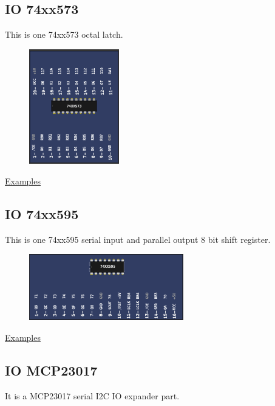 \subsection{IO 74xx573}

This is one 74xx573 octal latch.

\begin{figure}[H]
\center
\includegraphics[width=0.35\textwidth]{img/part_74xx573.png} 
\end{figure} 

\href{https://lcgamboa.github.io/picsimlab_examples/parts_IO_74xx573.html}{Examples} 

\subsection{IO 74xx595}

This is one 74xx595 serial input and parallel output 8 bit shift register.

\begin{figure}[H]
\center
\includegraphics[width=0.6\textwidth]{img/part_74xx595.png} 
\end{figure} 

\href{https://lcgamboa.github.io/picsimlab_examples/parts_IO_74xx595.html}{Examples}


\subsection{IO MCP23017}

It is a MCP23017 serial I2C IO expander part.

